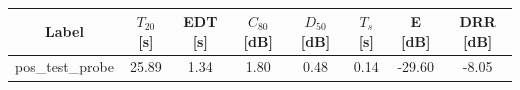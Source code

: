 \begin{table}[ht]
\centering
{}
\renewcommand{\arraystretch}{1.2}
\begin{tabular}{|c|c|c|c|c|c|c|c|}
\hline
Label & $T_{20}$ [s] & EDT [s] & $C_{80}$ [dB] & $D_{50}$ [dB] & $T_s$ [s] & E [dB] & DRR [dB] \\
\hline
pos_test_probe & 25.89 & 1.34 & 1.80 & 0.48 & 0.14 & -29.60 & -8.05 \\
\hline
\hline
\end{tabular}
\caption{}
\label{tab:objective_params}
\end{table}
